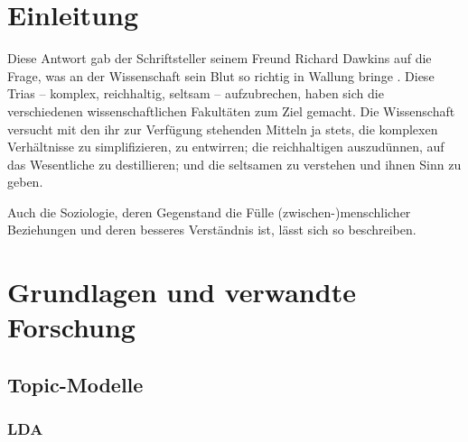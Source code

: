 \documentclass[11pt,a4paper,twoside]{article}
\begin{document}
{
\setcounter{tocdepth}{3}
\tableofcontents
}
\cleardoublepage

\setcounter{page}{1}

\fancyhead[LE,RO]{\rightmark}
\fancyhead[LO,RE]{\leftmark}
\fancyfoot[LE,RO]{\thepage}

\cleardoublepage

\hypertarget{einleitung}{%
\section{Einleitung}\label{einleitung}}

\vspace{1.5cm}

Diese Antwort gab der Schriftsteller seinem Freund Richard Dawkins auf
die Frage, was an der Wissenschaft sein Blut so richtig in Wallung
bringe \autocite[S. 170]{Dawkins2004}. Diese Trias -- komplex,
reichhaltig, seltsam -- aufzubrechen, haben sich die verschiedenen
wissenschaftlichen Fakultäten zum Ziel gemacht. Die Wissenschaft
versucht mit den ihr zur Verfügung stehenden Mitteln ja stets, die
komplexen Verhältnisse zu simplifizieren, zu entwirren; die
reichhaltigen auszudünnen, auf das Wesentliche zu destillieren; und die
seltsamen zu verstehen und ihnen Sinn zu geben.

Auch die Soziologie, deren Gegenstand die Fülle (zwischen-)menschlicher
Beziehungen und deren besseres Verständnis ist, lässt sich so
beschreiben.

\cleardoublepage

\hypertarget{grundlagen-und-verwandte-forschung}{%
\section{Grundlagen und verwandte
Forschung}\label{grundlagen-und-verwandte-forschung}}

\hypertarget{topic-modelle}{%
\subsection{Topic-Modelle}\label{topic-modelle}}

\hypertarget{lda}{%
\subsubsection{LDA}\label{lda}}
\end{document}
